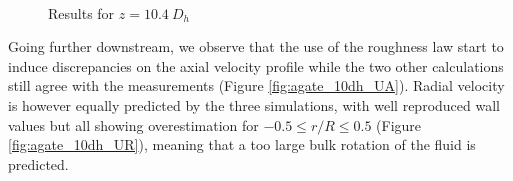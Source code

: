 \begin{figure}[!h]
\centering
{}
\\
\caption{Results for $z=10.4\ D_{h}$}
\label{fig:agate_cfd_10dh}
\end{figure}

Going further downstream, we observe that the use of the roughness law start to induce discrepancies on the axial velocity profile while the two other calculations still agree with the measurements (Figure \ref{fig:agate_10dh_UA}). Radial velocity is however equally predicted by the three simulations, with well reproduced wall values but all showing overestimation for $-0.5 \leq r/R \leq 0.5$ (Figure \ref{fig:agate_10dh_UR}), meaning that a too large bulk rotation of the fluid is predicted. 

